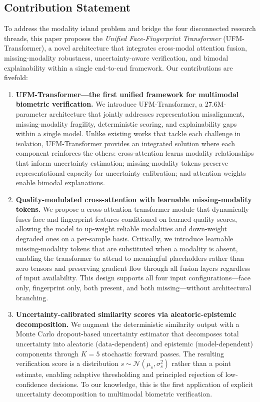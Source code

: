 \documentclass[10pt,journal,compsoc]{IEEEtran}
\begin{document}
\subsection{Contribution Statement}

To address the modality island problem and bridge the four disconnected research threads, this paper proposes the \textit{Unified Face-Fingerprint Transformer} (UFM-Transformer), a novel architecture that integrates cross-modal attention fusion, missing-modality robustness, uncertainty-aware verification, and bimodal explainability within a single end-to-end framework. Our contributions are fivefold:

\begin{enumerate}
    \item[C1.] \textbf{UFM-Transformer---the first unified framework for multimodal biometric verification.} We introduce UFM-Transformer, a 27.6M-parameter architecture that jointly addresses representation misalignment, missing-modality fragility, deterministic scoring, and explainability gaps within a single model. Unlike existing works that tackle each challenge in isolation, UFM-Transformer provides an integrated solution where each component reinforces the others: cross-attention learns modality relationships that inform uncertainty estimation; missing-modality tokens preserve representational capacity for uncertainty calibration; and attention weights enable bimodal explanations.

    \item[C2.] \textbf{Quality-modulated cross-attention with learnable missing-modality tokens.} We propose a cross-attention transformer module that dynamically fuses face and fingerprint features conditioned on learned quality scores, allowing the model to up-weight reliable modalities and down-weight degraded ones on a per-sample basis. Critically, we introduce learnable missing-modality tokens that are substituted when a modality is absent, enabling the transformer to attend to meaningful placeholders rather than zero tensors and preserving gradient flow through all fusion layers regardless of input availability. This design supports all four input configurations---face only, fingerprint only, both present, and both missing---without architectural branching.

    \item[C3.] \textbf{Uncertainty-calibrated similarity scores via aleatoric-epistemic decomposition.} We augment the deterministic similarity output with a Monte Carlo dropout-based uncertainty estimator that decomposes total uncertainty into aleatoric (data-dependent) and epistemic (model-dependent) components through $K=5$ stochastic forward passes. The resulting verification score is a distribution $s \sim \mathcal{N}(\mu_s, \sigma_s^2)$ rather than a point estimate, enabling adaptive thresholding and principled rejection of low-confidence decisions. To our knowledge, this is the first application of explicit uncertainty decomposition to multimodal biometric verification.


\end{enumerate}
\end{document}
